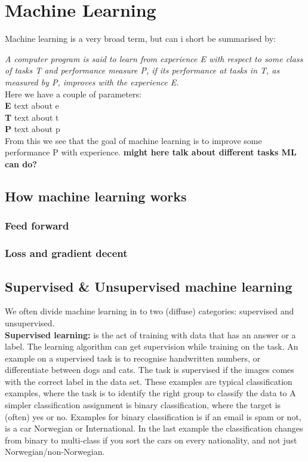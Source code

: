 \section{Machine Learning}
    Machine learning is a very broad term, but can i short be summarised by:\\
    \vspace{10px}
	
    \textit{ A computer program is said to learn from experience E with respect to 
    some class of tasks T and performance measure P, if its performance at
    tasks in T, as measured by P, improves with the experience E. } 
    \cite{MitchellTomM1997Ml}\\
	
    \vspace{10px}
    Here we have a couple of parameters:\\
    \textbf{E} text about e\\
    \textbf{T} text about t\\
    \textbf{P} text about p\\
	
    From this we see that the goal of machine learning is to improve some performance P with experience.
    \textbf{might here talk about different tasks ML can do?}

    \subsection{How machine learning works}   
	\subsubsection{Feed forward}
    
	\subsubsection{Loss and gradient decent }

    
    \subsection{Supervised \& Unsupervised machine learning}
	We often divide machine learning in to two (diffuse) categories: supervised and unsupervised.\\
	\vspace{5px}
	\textbf{Supervised learning:} is the act of training with data that has an answer or a label. The learning algorithm can get supervision while 
	training on the task. An example on a supervised task  is to recognise handwritten numbers, or differentiate between dogs and cats. The task is supervised if the images
	comes with the correct label in the data set. These  examples are typical classification examples, where the task is to identify the right group to classify the data to %
	A simpler classification assignment is binary classification, where the target is (often) yes or no. Examples for binary classification is if an email is spam or not, is a car Norwegian 
	or International. 
	In the last example the classification changes from binary to multi-class if you sort the cars on every nationality, and not just Norwegian/non-Norwegian.
	  

